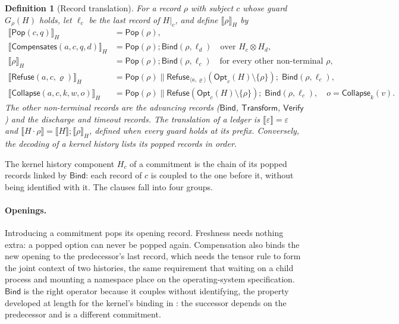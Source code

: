 \documentclass[11pt,openany]{book}
\newtheorem{definition}[theorem]{Definition}
\theoremstyle{remark}
\newcommand{\Pop}{\mathsf{Pop}}
\newcommand{\Refuse}{\mathsf{Refuse}}
\newcommand{\Bind}{\mathsf{Bind}}
\newcommand{\Transform}{\mathsf{Transform}}
\newcommand{\Verify}{\mathsf{Verify}}
\newcommand{\Collapse}{\mathsf{Collapse}}
\newcommand{\Compensates}{\mathsf{Compensates}}
\begin{document}
\begin{definition}[Record translation]\label{def:translation}
For a record $\rho$ with subject $c$ whose guard $G_\rho(H)$ holds, let
$\ell_c$ be the last record of $H|_c$, and define $\llbracket\rho\rrbracket_H$ by
\[
\begin{aligned}
\llbracket\Pop(c,q)\rrbracket_H&=\Pop(\rho),\\
\llbracket\Compensates(a,c,q,d)\rrbracket_H&=\Pop(\rho);\Bind(\rho,\ell_d)
  \quad\text{over }H_c\otimes H_d,\\
\llbracket\rho\rrbracket_H&=\Pop(\rho);\Bind(\rho,\ell_c)
  \quad\text{for every other non-terminal }\rho,\\
\llbracket\Refuse(a,c,\varrho)\rrbracket_H&=
  \Pop(\rho)\parallel\Refuse_{\langle a,\varrho\rangle}(\mathsf{Opt}_c(H)\setminus\{\rho\});\;
  \Bind(\rho,\ell_c),\\
\llbracket\Collapse(a,c,k,w,o)\rrbracket_H&=
  \Pop(\rho)\parallel\Refuse(\mathsf{Opt}_c(H)\setminus\{\rho\});\;
  \Bind(\rho,\ell_c),
  \quad o=\Collapse_k(v).
\end{aligned}
\]
The other non-terminal records are the advancing records ($\Bind$,
$\Transform$, $\Verify$) and the discharge and timeout records.
The translation of a ledger is $\llbracket\varepsilon\rrbracket=\varepsilon$
and $\llbracket H\cdot\rho\rrbracket=\llbracket H\rrbracket;
\llbracket\rho\rrbracket_H$, defined when every guard holds at its
prefix. Conversely, the \emph{decoding} of a kernel history lists its
popped records in order.
\end{definition}

The kernel history component $H_c$ of a commitment is the chain of its
popped records linked by $\Bind$: each record of $c$ is coupled to the one
before it, without being identified with it. The clauses fall into four
groups.

\paragraph{Openings.} Introducing a commitment pops its opening record.
Freshness needs nothing extra: a popped option can never be popped again.
Compensation also binds the new opening to the predecessor's last record,
which needs the tensor rule to form the joint context of two histories,
the same requirement that waiting on a child process and mounting a
namespace place on the operating-system specification. $\Bind$ is the
right operator because it couples without identifying, the property
developed at length for the kernel's binding in \cite{flyxion-binding}: the successor
depends on the predecessor and is a different commitment.
\end{document}
